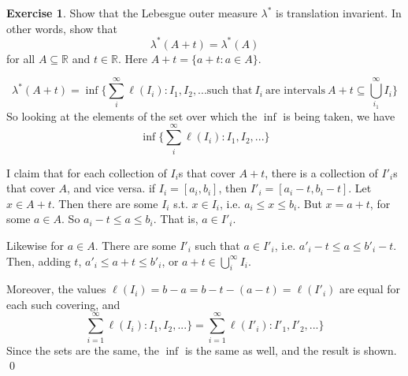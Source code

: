 \documentclass[11pt,oneside]{article}
\numberwithin{equation}{section}
\theoremstyle{definition}
\newtheorem{exercise}{Exercise}
\def\RR{\mathbb{R}}
\begin{document}
\begin{exercise}
  Show that the Lebesgue outer measure $ \lambda ^ *$ is translation invarient.  In other words,
  show that
  $$
  \lambda ^*(A + t) = \lambda ^*(A)
  $$
  for all $A \subseteq \RR$ and $t \in \RR$.  Here $A + t = \{ a + t: a \in A \}$.  
\end{exercise}
\begin{solution}
  $$
  \lambda ^* (A+t) = \inf \{ \sum \limits _ i ^ \infty \ell (I_i) : I_1, I_2, ... \text{such that} \ I_i \ \text{are intervals} \ 
  A + t \subseteq \bigcup \limits _{i_1} ^ \infty I_i \}
  $$
  So looking at the elements of the set over which the $\inf$ is being taken, we have
  $$
  \inf \{ \sum \limits _ i ^ \infty \ell (I_i) : I_1, I_2, ... \}
  $$

  I claim that for each collection of $I_i$s that cover $A+t$,
  there is a collection of $I'_i$s that cover $A$, and vice versa.  if
  $I_i = [a_i, b_i]$, then $I'_i = [a_i-t, b_i-t]$.  Let $x \in A + t $.
  Then there are some $I_i$ s.t. $ x \in I_i$, i.e. $ a_i  \leq x \leq b_i$.
  But $x = a + t$, for some $a \in A$.  So $ a_i - t \leq a \leq b_i$.  That is,
  $a \in I'_i$.

  Likewise for $a \in A$.  There are some $I'_i$ such that $a \in I'_i$, i.e.
  $ a'_i -t  \leq a \leq b'_i - t$.  Then, adding $t$, $a'_i \leq a + t \leq b'_i$, or
  $ a + t \in \bigcup \limits _ i ^ \infty I_i$.

  Moreover, the values $\ell(I_i) = b - a = b - t - (a - t) = \ell(I'_i)$ are equal for each such
  covering, and
  $$ \sum \limits _ {i=1} ^ \infty \ell (I_i) : I_1, I_2, ... \} = 
  \sum \limits _ {i=1} ^ \infty \ell (I'_i) : I'_1, I'_2, ... \}
  $$
  Since the sets are the same, the $\inf$ is the same as well, and the result is shown.  \qed
  
\end{solution}

\begin{comment}
\begin{exercise}
  problem
\end{exercise}
\begin{solution}
\begin{enumerate}[(a)]
\item
  first answer
\end{enumerate}
\end{solution}
\end{comment}
\end{document}

